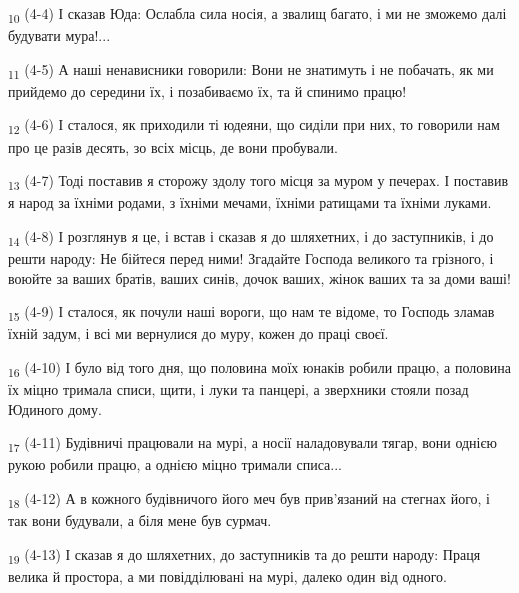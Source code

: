 \begin{tcolorbox}
\textsubscript{10} (4-4) І сказав Юда: Ослабла сила носія, а звалищ багато, і ми не зможемо далі будувати мура!...
\end{tcolorbox}
\begin{tcolorbox}
\textsubscript{11} (4-5) А наші ненависники говорили: Вони не знатимуть і не побачать, як ми прийдемо до середини їх, і позабиваємо їх, та й спинимо працю!
\end{tcolorbox}
\begin{tcolorbox}
\textsubscript{12} (4-6) І сталося, як приходили ті юдеяни, що сиділи при них, то говорили нам про це разів десять, зо всіх місць, де вони пробували.
\end{tcolorbox}
\begin{tcolorbox}
\textsubscript{13} (4-7) Тоді поставив я сторожу здолу того місця за муром у печерах. І поставив я народ за їхніми родами, з їхніми мечами, їхніми ратищами та їхніми луками.
\end{tcolorbox}
\begin{tcolorbox}
\textsubscript{14} (4-8) І розглянув я це, і встав і сказав я до шляхетних, і до заступників, і до решти народу: Не бійтеся перед ними! Згадайте Господа великого та грізного, і воюйте за ваших братів, ваших синів, дочок ваших, жінок ваших та за доми ваші!
\end{tcolorbox}
\begin{tcolorbox}
\textsubscript{15} (4-9) І сталося, як почули наші вороги, що нам те відоме, то Господь зламав їхній задум, і всі ми вернулися до муру, кожен до праці своєї.
\end{tcolorbox}
\begin{tcolorbox}
\textsubscript{16} (4-10) І було від того дня, що половина моїх юнаків робили працю, а половина їх міцно тримала списи, щити, і луки та панцері, а зверхники стояли позад Юдиного дому.
\end{tcolorbox}
\begin{tcolorbox}
\textsubscript{17} (4-11) Будівничі працювали на мурі, а носії наладовували тягар, вони однією рукою робили працю, а однією міцно тримали списа...
\end{tcolorbox}
\begin{tcolorbox}
\textsubscript{18} (4-12) А в кожного будівничого його меч був прив'язаний на стегнах його, і так вони будували, а біля мене був сурмач.
\end{tcolorbox}
\begin{tcolorbox}
\textsubscript{19} (4-13) І сказав я до шляхетних, до заступників та до решти народу: Праця велика й простора, а ми повідділювані на мурі, далеко один від одного.
\end{tcolorbox}
